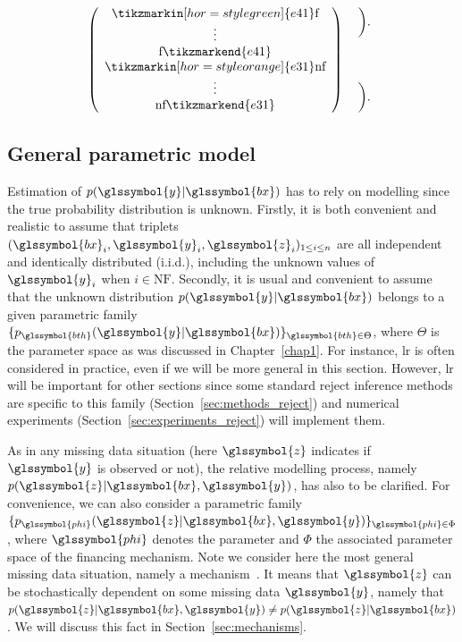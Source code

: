 \[\left( \begin{array}{c}
\tikzmarkin[hor=style green]{e41} \text{f} \\
\vdots \\
\text{f} \tikzmarkend{e41} \\ 
\tikzmarkin[hor=style orange]{e31} \text{nf} \\
\vdots \\
\text{nf} \tikzmarkend{e31} \end{array} \right)
 \hspace{0.2cm}
 \begin{array}{c}
\bigg). \\
\\
\\
\\
\bigg). \end{array}
\]


\subsection{General parametric model}

Estimation of $p(\glssymbol{y}|\glssymbol{bx})$ has to rely on modelling since the true probability distribution is unknown. Firstly, it is both convenient and realistic to assume that triplets $(\glssymbol{bx}_i,\glssymbol{y}_i,\glssymbol{z}_i)_{1\le i\le n}$ are all independent and identically distributed (i.i.d.), including the unknown values of $\glssymbol{y}_i$ when $i\in \text{NF}$. Secondly, it is usual and convenient to assume that the unknown distribution $p(\glssymbol{y}|\glssymbol{bx})$ belongs to a given parametric family $\{p_{\glssymbol{bth}}(\glssymbol{y}|\glssymbol{bx})\}_{\glssymbol{bth} \in\Theta}$, where $\Theta$ is the parameter space as was discussed in Chapter~\ref{chap1}. For instance, \gls{lr} is often considered in practice, even if we will be more general in this section. However, \gls{lr} will be important for other sections since some standard reject inference methods are specific to this family (Section~\ref{sec:methods_reject}) and numerical experiments (Section~\ref{sec:experiments_reject}) will implement them.

As in any missing data situation (here $\glssymbol{z}$ indicates if $\glssymbol{y}$ is observed or not), the relative modelling process, namely $p(\glssymbol{z}|\glssymbol{bx},\glssymbol{y})$, has also to be clarified. For convenience, we can also consider a parametric family $\{p_{\glssymbol{phi}}(\glssymbol{z}|\glssymbol{bx},\glssymbol{y})\}_{\glssymbol{phi} \in \Phi}$, where $\glssymbol{phi}$ denotes the parameter and $\Phi$ the associated parameter space of the financing mechanism. Note we consider here the most general missing data situation, namely a  mechanism~\cite{littlerubin}. It means that $\glssymbol{z}$ can be stochastically dependent on some missing data $\glssymbol{y}$, namely that $p(\glssymbol{z}|\glssymbol{bx},\glssymbol{y})\neq p(\glssymbol{z}|\glssymbol{bx})$. We will discuss this fact in Section~\ref{sec:mechanisms}.

